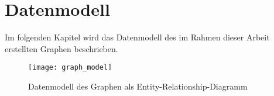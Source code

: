 \chapter{Datenmodell}

Im folgenden Kapitel wird das Datenmodell des im Rahmen dieser Arbeit erstellten Graphen beschrieben.

\begin{figure}[h]
\label{fig:graph_model}
\begin{center}
    \texttt{[image: graph\_model]}
\end{center}
\caption{Datenmodell des Graphen als Entity-Relationship-Diagramm}
\end{figure}